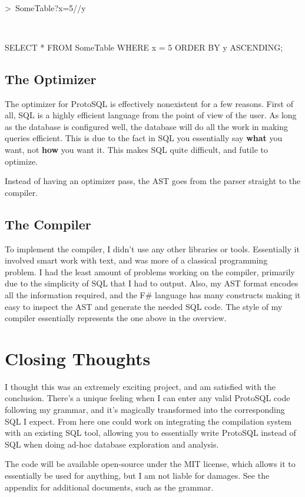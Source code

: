 \documentclass[titlepage]{article}
\begin{document}
			~\centerline{\textgreater\ SomeTable?x=5//y}
			~\centerline{SELECT * FROM SomeTable WHERE x = 5 ORDER BY y ASCENDING;}
			\newline

		\subsection{The Optimizer}

			The optimizer for ProtoSQL is effectively nonexistent for a few reasons.  First of all, SQL is a highly efficient language from the point of view of the user.  As long as the database is configured well, the database will do all the work in making queries efficient.  This is due to the fact in SQL you essentially say \textbf{what} you want, not \textbf{how} you want it.  This makes SQL quite difficult, and futile to optimize.

			Instead of having an optimizer pass, the AST goes from the parser straight to the compiler.

		\subsection{The Compiler}

			To implement the compiler, I didn't use any other libraries or tools.  Essentially it involved smart work with text, and was more of a classical programming problem.  I had the least amount of problems working on the compiler, primarily due to the simplicity of SQL that I had to output.  Also, my AST format encodes all the information required, and the F\# language has many constructs making it easy to inspect the AST and generate the needed SQL code.  The style of my compiler essentially represents the one above in the overview.

	\section{Closing Thoughts}

		I thought this was an extremely exciting project, and am satisfied with the conclusion.  There's a unique feeling when I can enter any valid ProtoSQL code following my grammar, and it's magically transformed into the corresponding SQL I expect.  From here one could work on integrating the compilation system with an existing SQL tool, allowing you to essentially write ProtoSQL instead of SQL when doing ad-hoc database exploration and analysis.

		The code will be available open-source under the MIT license, which allows it to essentially be used for anything, but I am not liable for damages.  See the appendix for additional documents, such as the grammar.
\end{document}
